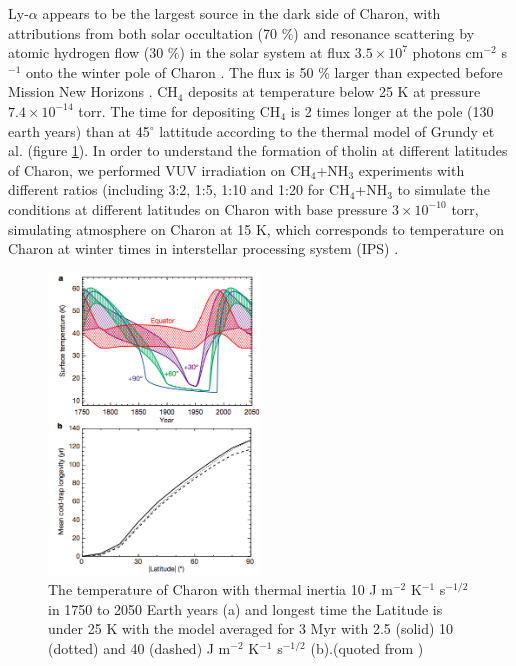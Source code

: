 Ly-$\alpha$ appears to be the largest source in the dark side of Charon, with attributions from both solar occultation (70 \%) and resonance scattering by atomic hydrogen flow (30 \%) in the solar system at flux $3.5 \times 10^7$ photons cm$^{-2}$ s$^{-1}$ onto the winter pole of Charon \cite{grundy2016formation}. The flux is 50 \% larger than expected before Mission New Horizons \cite{gladstone2015lyalpha}. CH$_4$ deposits at temperature below 25 K at pressure $7.4 \times 10^{-14}$ torr. The time for depositing CH$_4$ is 2 times longer at the pole (130 earth years) than at 45$^{\circ}$ lattitude according to the thermal model of Grundy et al. \cite{grundy2016formation} (figure \ref{fig:Charon_thermal}). In order to understand the formation of tholin at different latitudes of Charon, we performed VUV irradiation on CH$_4$+NH$_3$ experiments with different ratios (including 3:2, 1:5, 1:10 and 1:20 for CH$_4$+NH$_3$ to simulate the conditions at different latitudes on Charon with base pressure $3 \times 10^{-10}$ torr, simulating atmosphere on Charon at 15 K, which corresponds to temperature on Charon at winter times \cite{grundy2016formation} in interstellar processing system (IPS) \cite{chen2013vacuum}.

\begin{figure}
\centering
\includegraphics[width=0.5\textwidth]{figures/chapter1/thermal.png}
\caption{The temperature of Charon with thermal inertia 10 J m$^{-2}$ K$^{-1}$ s$^{-1/2}$ in 1750 to 2050 Earth years (a) and longest time the Latitude is under 25 K with the model averaged for 3 Myr with 2.5 (solid) 10 (dotted) and 40 (dashed) J m$^{-2}$ K$^{-1}$ s$^{-1/2}$ (b).(quoted from \cite{grundy2016formation})}
\label{fig:Charon_thermal}
\end{figure}

